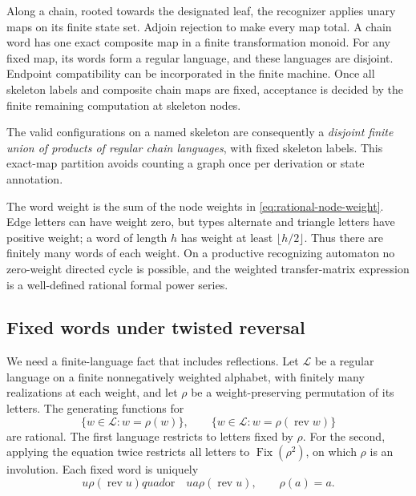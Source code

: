 Along a chain, rooted towards the designated leaf, the recognizer
applies unary maps on its finite state set.  Adjoin rejection to
make every map total.  A chain word has one exact composite map
in a finite transformation monoid.  For any fixed map, its words
form a regular language, and these languages are disjoint.  Endpoint
compatibility can be incorporated in the finite machine.  Once all
skeleton labels and composite chain maps are fixed, acceptance is
decided by the finite remaining computation at skeleton nodes.

The valid configurations on a named skeleton are consequently a
\emph{disjoint finite union of products of regular chain languages},
with fixed skeleton labels.  This exact-map partition avoids
counting a graph once per derivation or state annotation.

The word weight is the sum of the node weights in
\eqref{eq:rational-node-weight}.  Edge letters can have weight zero,
but types alternate and triangle letters have positive weight;
a word of length $h$ has weight at least $\lfloor h/2\rfloor$.
Thus there are finitely many words of each weight.  On a productive
recognizing automaton no zero-weight directed cycle is possible,
and the weighted transfer-matrix expression is a well-defined
rational formal power series.

\subsection{Fixed words under twisted reversal}

We need a finite-language fact that includes reflections.  Let
$\mathcal L$ be a regular language on a finite nonnegatively
weighted alphabet, with finitely many realizations at each weight,
and let $\rho$ be a weight-preserving permutation of its letters.
The generating functions for
\[
 \{w\in\mathcal L:w=\rho(w)\},\qquad
 \{w\in\mathcal L:w=\rho(\operatorname{rev}w)\}
\]
are rational.  The first language restricts to letters fixed by
$\rho$.  For the second, applying the equation twice restricts all
letters to $\operatorname{Fix}(\rho^2)$, on which $\rho$ is an
involution.  Each fixed word is uniquely
\[
 u\rho(\operatorname{rev}u)quad\text{or}\quad
 ua\rho(\operatorname{rev}u),\qquad\rho(a)=a.
\]

